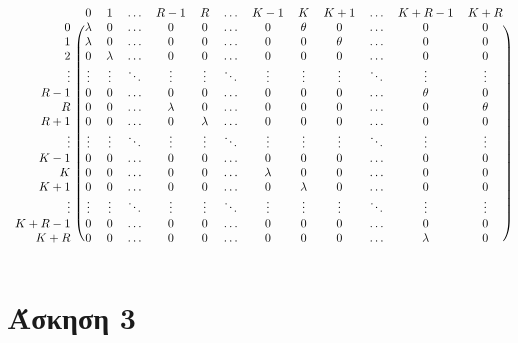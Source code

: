 \documentclass[a4paper,11pt]{article}
\begin{document}
\[
	\begin{blockarray}{rcccccccccccc}
		& 0 & 1 & \dots & R-1 & R & \dots & K-1 & K & K+1 & \dots & K+R-1 & K+R \\
		\begin{block}{r(cccccccccccc)}
			0 & \lambda & 0 & \dots & 0 & 0 & \dots & 0 & \theta & 0 & \dots & 0 & 0 \\
			1 & \lambda & 0 & \dots & 0 & 0 & \dots & 0 & 0 & \theta & \dots & 0 & 0 \\
			2 & 0 & \lambda & \dots & 0 & 0 & \dots & 0 & 0 & 0 & \dots & 0 & 0 \\
			\vdots & \vdots & \vdots & \ddots & \vdots & \vdots & \ddots & \vdots & \vdots & \vdots & \ddots & \vdots & \vdots \\
			R-1 & 0 & 0 & \dots & 0 & 0 & \dots & 0 & 0 & 0 & \dots & \theta & 0 \\
			R & 0 & 0 & \dots & \lambda & 0 & \dots & 0 & 0 & 0 & \dots & 0 & \theta \\
			R+1 & 0 & 0 & \dots & 0 & \lambda & \dots & 0 & 0 & 0 & \dots & 0 & 0 \\
			\vdots & \vdots & \vdots & \ddots & \vdots & \vdots & \ddots & \vdots & \vdots & \vdots & \ddots & \vdots & \vdots \\
			K-1 & 0 & 0 & \dots & 0 & 0 & \dots & 0 & 0 & 0 & \dots & 0 & 0 \\
			K & 0 & 0 & \dots & 0 & 0 & \dots & \lambda & 0 & 0 & \dots & 0 & 0 \\
			K+1 & 0 & 0 & \dots & 0 & 0 & \dots & 0 & \lambda & 0 & \dots & 0 & 0 \\
			\vdots & \vdots & \vdots & \ddots & \vdots & \vdots & \ddots & \vdots & \vdots & \vdots & \ddots & \vdots & \vdots \\
			K+R-1 & 0 & 0 & \dots & 0 & 0 & \dots & 0 & 0 & 0 & \dots & 0 & 0 \\
			K+R & 0 & 0 & \dots & 0 & 0 & \dots & 0 & 0 & 0 & \dots & \lambda & 0 \\
		\end{block}
	\end{blockarray}
\]


\section*{Άσκηση 3}
\end{document}
